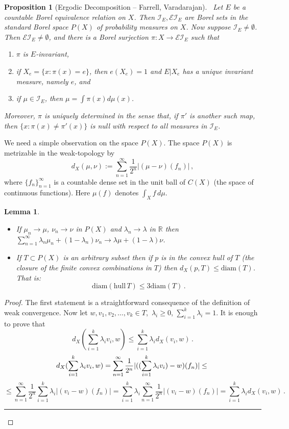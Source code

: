 \documentclass{article}
\newtheorem{lemma}{Lemma}[section]
\newtheorem{propo}{Proposition}[section]
\newcommand{\R}{\mathbb{R}}
\newcommand{\I}{\mathcal{I}}
\newcommand{\EI}{\mathcal{EI}}
\newcommand{\qed} {\hspace {0.1in} \rule {1.5mm} {3.5mm}}
\begin{document}
\begin{propo}[Ergodic Decomposition -- Farrell, Varadarajan]~\label{decomp} Let
$E$ be a countable Borel equivalence relation on $X$. Then $\I_E,
\EI_E$ are Borel sets in the standard Borel space $P(X)$ of
probability measures on $X$.  Now suppose $\I_E \neq \emptyset$.
Then $\EI_E \neq \emptyset$, and there is a Borel surjection $\pi :
X \to \EI_E$ such that
\begin{enumerate}
\item $\pi$ is $E$-invariant,
\item if $X_e = \{x : \pi(x) = e\}$, then $e(X_e) = 1$ and $E|X_e$ has a
unique invariant measure, namely $e$, and
\item if $\mu \in \I_E$, then $\mu = \int \pi(x) d\mu(x)$.
\end{enumerate}
 Moreover, $\pi$ is uniquely determined in the sense that, if $\pi'$
is another such map, then $\{x : \pi(x) \neq \pi'(x)\}$ is null with
respect to all measures in $\I_E$.
\end{propo}
We need a simple observation on the space $P(X)$. The space $P(X)$
is metrizable in the weak-topology by
$$d_X(\mu,\nu):=\sum^\infty_{n=1}\frac{1}{2^n}|(\mu-\nu)(f_n)|\,,$$
where $\{f_n\}^\infty_{n=1}$ is a countable dense set in the unit
ball of $C(X)$ (the space of continuous functions). Here $\mu(f)$ denotes
$\int_Xf\,d\mu$.
\begin{lemma} \label{l21}

\noindent
\begin{itemize}\item
If $\mu_n\to \mu$, $\nu_n\to\nu$ in $P(X)$ and $\lambda_n\to\lambda$ in $\R$
then $\sum_{n=1}^\infty \lambda_n\mu_n+(1-\lambda_n)\nu_n\to
\lambda\mu+(1-\lambda)\nu$.
\item If $T\subset P(X)$ is an arbitrary subset then if $p$ is in
the convex hull of $T$
(the closure of the finite convex combinations in $T$) then
$d_X(p,T)\leq\mbox{diam}(T)$. That is:
$$\mbox{diam}(\mbox{hull}\,T)\leq3 \mbox{diam}(T)\,.$$
\end{itemize}
\end{lemma}
\begin{proof}
The first statement is a straightforward consequence of the definition
of weak convergence. Now let $w,v_1,v_2,\dots,v_k\in T$,\
$\lambda_i\geq 0$, $\sum_{i=1}^k \lambda_i=1$.
It is enough to prove that
$$d_X(\sum^k_{i=1}\lambda_i v_i,w)\leq\sum^k_{i=1}\lambda_i d_X(v_i,w)\,.$$
$$d_X (\sum^k_{i=1}\lambda_i v_i,w)=
\sum^\infty_{n=1}\frac{1}{2^n}|((\sum_{i=1}^k\lambda_iv_i)-w)(f_n)|\leq\\$$
$$\leq \sum^\infty_{n=1}\frac{1}{2^n}\sum_{i=1}^k \lambda_i |(v_i-w)(f_n)|=
\sum_{i=1}^k \lambda_i \sum^\infty_{n=1}\frac{1}{2^n}|(v_i-w)(f_n)|=
\sum^k_{i=1}\lambda_i d_X(v_i,w)\,.$$
\qed \end{proof}
\end{document}
